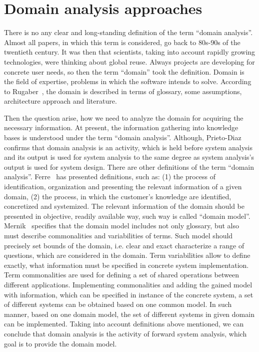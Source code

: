 \documentclass[conference]{IEEEtran}
\begin{document}
\section{Domain analysis approaches}
\label{chapter:approaches}
There is no any clear and long-standing definition of the term ``domain analysis''. Almost all papers, in which this term is considered, go back to 80s-90s of the twentieth century. It was then that scientists, taking into account rapidly growing technologies, were thinking about global reuse. Always projects are developing for concrete user needs, so then the term ``domain'' took the definition. Domain is the field of expertise, problems in which the software intends to solve. According to Rugaber~\cite{rugaber1994domain}, the domain is described in terms of glossary, some assumptions, architecture approach and literature. 


Then the question arise, how we need to analyze the domain for acquiring the necessary information. At present, the information gathering into knowledge bases is understood under the term ``domain analysis''. Although, Prieto-Diaz~\cite{prieto1988domain} confirms that domain analysis is an activity, which is held before system analysis and its output is used for system analysis to the same degree as system analysis’s output is used for system design.  There are other definitions of the term ``domain analysis''. Ferre~\cite{ferre1999evaluation} has presented definitions, such as: (1) the process of identification, organization and presenting the relevant information of a given domain, (2) the process, in which the customer’s knowledge are identified, concretized and systemized. The relevant information of the domain should be presented in objective, readily available way, such way is called ``domain model''. Mernik~\cite{mernik2005} specifies that the domain model includes not only glossary, but also must describe commonalities and variabilities of terms. Such model should precisely set bounds of the domain, i.e. clear and exact characterize a range of questions, which are considered in the domain. Term variabilities allow to define exactly, what information must be specified in concrete system implementation. Term commonalities are used for defining a set of shared operations between different applications. Implementing commonalities and adding the gained model  with information, which can be specified in instance of the concrete system, a set of different systems can be obtained based on one common model. In such manner, based on one domain model, the set of different systems in given domain can be implemented. Taking into account definitions above mentioned, we can conclude that domain analysis is the activity of forward system analysis, which goal is to provide the domain model. 
\end{document}
